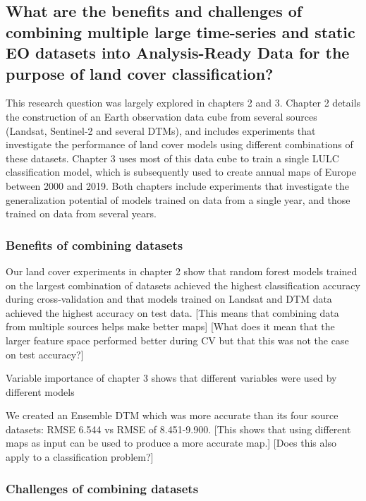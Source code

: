     \subsection{What are the benefits and challenges of combining multiple large time-series and static EO datasets into Analysis-Ready Data for the purpose of land cover classification?}

This research question was largely explored in chapters 2 and 3. Chapter 2 details the construction of an Earth observation data cube from several sources (Landsat, Sentinel-2 and several DTMs), and includes experiments that investigate the performance of land cover models using different combinations of these datasets. Chapter 3 uses most of this data cube to train a single LULC classification model, which is subsequently used to create annual maps of Europe between 2000 and 2019. Both chapters include experiments that investigate the generalization potential of models trained on data from a single year, and those trained on data from several years.

    \subsubsection{Benefits of combining datasets}

        Our land cover experiments in chapter 2 show that random forest models trained on the largest combination of datasets achieved the highest classification accuracy during cross-validation and that models trained on Landsat and DTM data achieved the highest accuracy on test data.
        [This means that combining data from multiple sources helps make better maps]
        [What does it mean that the larger feature space performed better during CV but that this was not the case on test accuracy?]

        Variable importance of chapter 3 shows that different variables were used by different models

        We created an Ensemble DTM which was more accurate than its four source datasets: RMSE 6.544 vs RMSE of 8.451-9.900. [This shows that using different maps as input can be used to produce a more accurate map.]
        [Does this also apply to a classification problem?]

        

    \subsubsection{Challenges of combining datasets}
        
